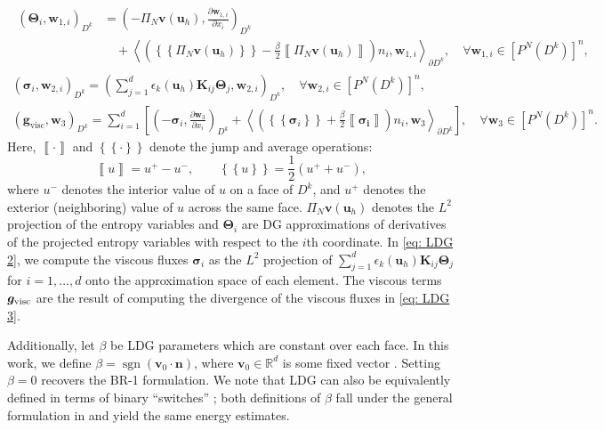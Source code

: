 \documentclass{elsarticle}
\theoremstyle{definition}
\theoremstyle{plain}
\theoremstyle{plain}
\newcommand{\pd}[2]{\frac{\partial#1}{\partial#2}}
\newcommand{\LRp}[1]{\left( #1 \right)} %
\newcommand{\LRa}[1]{\left\langle #1 \right\rangle} %
\newcommand{\LRc}[1]{\left\{ #1 \right\}} %
\newcommand{\jump}[1] {\ensuremath{\left\llbracket#1\right\rrbracket}} %
\newcommand{\avg}[1] {\ensuremath{\LRc{\!\!\LRc{#1}\!\!}}}
\DeclareMathOperator{\sgn}{sgn}
\newcommand{\ProjV}{\Pi_N\bm{v}(\bm{u}_h)}
\newcommand{\refone}[1]{{\color{red}#1}}
\newcommand{\reftwo}[1]{{\color{blue}#1}}
\renewcommand{\refone}[1]{#1}
\renewcommand{\reftwo}[1]{#1}
\begin{document}
\begin{gather}
    \begin{aligned}
        \LRp{\bm{\Theta}_i, \bm{w}_{1,i}}_{D^k} &= \LRp{-\reftwo{\ProjV},\pd{\bm{w}_{1,i}}{x_i}}_{D^k} \\
        &\quad + \LRa{ \left(\avg{\reftwo{\ProjV}} - \frac{\beta}{2}\jump{\reftwo{\ProjV}}\right)n_i,\bm{w}_{1,i} }_{\partial D^k}, \quad \forall \bm{w}_{1,i} \in \left[P^N(D^k) \right]^n \refone{,}
    \end{aligned} \label{eq: LDG 1} \\[1.5ex]
    \label{eq: LDG 2}
    \left(\bm{\sigma}_i, \bm{w}_{2,i} \right)_{D^k} = \left(\sum_{j=1}^d \epsilon_k(\bm{u}_h)\bm{K}_{ij} \bm{\Theta}_j, \bm{w}_{2,i} \right)_{D^k},\quad \forall \bm{w}_{2,i} \in \left[P^N(D^k) \right]^n \refone{,}\\[1.5ex]
    \label{eq: LDG 3}
    \left(\bm{g}_{\text{visc}},\bm{w}_3 \right)_{D^k} = \sum_{i=1}^d \left[\left(-\bm{\sigma}_i,\pd{\bm{w}_3}{x_i} \right)_{D^k} + \left\langle\left(\avg{\bm{\sigma}_i} + \frac{\beta}{2} \jump{\bm{\sigma_i}}\right)n_i,\bm{w}_3 \right\rangle_{\partial D^k}\right], \quad \forall \bm{w}_{3} \in \left[P^N(D^k) \right]^n.
\end{gather}
Here, $\jump{\cdot}$ and $\avg{\cdot}$ denote the jump and average operations:
\[
\jump{u} = u^+ - u^-, \qquad  \avg{u} = \frac{1}{2}\LRp{u^+ + u^-},
\]
where $u^-$ denotes the interior value of $u$ on a face of $D^k$, and $u^+$ denotes the exterior (neighboring) value of $u$ across the same face. \reftwo{$\ProjV$ denotes the $L^2$ projection of the entropy variables and} $\bm{\Theta}_i$ are DG approximations of derivatives of the \reftwo{projected entropy variables with respect to the $i$th coordinate}. In \eqref{eq: LDG 2}, we compute the viscous fluxes $\bm{\sigma}_i$ as the $L^2$ projection of $\sum_{j=1}^d \reftwo{\epsilon_k(\bm{u}_h)}\bm{K}_{ij}\bm{\Theta}_j$ for $i = 1,\ldots, d$ onto the approximation space of each element. The viscous terms  $\bm{g}_{\rm visc}$ are the result of computing the divergence of the viscous fluxes in \eqref{eq: LDG 3}. 

Additionally, let $\beta$ be LDG parameters which are constant over each face. In this work, we define \refone{$\beta = \sgn{(\bm{v}_0 \cdot \bm{n})}$}, where $\bm{v}_0 \in \mathbb{R}^d$ is some fixed vector \cite{cockburn2007analysis}. Setting $\beta = 0$ recovers the BR-1 formulation. We note that LDG can also be equivalently defined in terms of binary ``switches''  \cite{peraire2008compact}; both definitions of $\beta$ fall under the general formulation in \cite{cockburn1998local} and yield the same energy estimates. 
\end{document}
